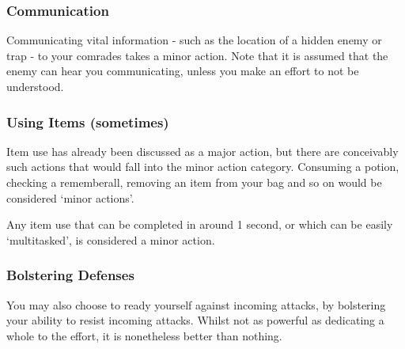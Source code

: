 \subsubsection{Communication} 

Communicating vital information - such as the location of a hidden enemy or trap - to your comrades takes a minor action. Note that it is assumed that the enemy can hear you communicating, unless you make an effort to not be understood. 

\subsubsection{Using Items (sometimes)}

Item use has already been discussed as a major action, but there are conceivably such actions that would fall into the minor action category. Consuming a potion, checking a rememberall, removing an item from your bag and so on would be considered `minor actions'. 

Any item use that can be completed in around 1 second, or which can be easily `multitasked', is considered a minor action. 

\subsubsection{Bolstering Defenses}
 
 You may also choose to ready yourself against incoming attacks, by bolstering your ability to resist incoming attacks. Whilst not as powerful as dedicating a whole  to the effort, it is nonetheless better than nothing. 

